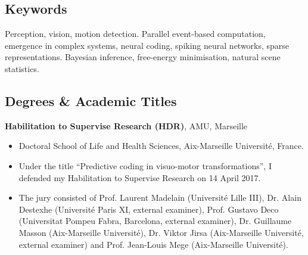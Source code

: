 \documentclass[10pt,english,a4paper,oneside]{article}%
\newcommand{\years}[1]{\marginpar{\textit{\scriptsize #1}}}
\begin{document}
\subsection*{Keywords}
Perception, vision, motion detection. Parallel event-based computation, emergence in complex systems, neural coding, spiking neural networks, sparse representations. Bayesian inference, free-energy minimisation, natural scene statistics.

\subsection{Degrees \& Academic Titles}

\textbf{Habilitation to Supervise Research (HDR)}, AMU, Marseille\hfill \years{\textbf{2017}}\\
\vspace*{-.15in}
\begin{itemize}
\item[] Doctoral School of Life and Health Sciences, Aix-Marseille Université, France.
\item[] Under the title ``Predictive coding in visuo-motor transformations'', I defended my Habilitation to Supervise Research on 14 April 2017.
\item[] The jury consisted of Prof. Laurent Madelain (Université Lille III), Dr. Alain Destexhe (Université Paris XI, external examiner), Prof. Gustavo Deco (Universitat Pompeu Fabra, Barcelona, external examiner), Dr. Guillaume Masson (Aix-Marseille Université), Dr. Viktor Jirsa (Aix-Marseille Université, external examiner) and Prof. Jean-Louis Mege (Aix-Marseille Université).
\end{itemize} %
\end{document}
